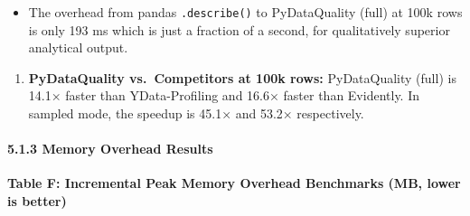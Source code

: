 \documentclass{article}
\begin{document}
\begin{itemize}
\item
  The overhead from pandas \texttt{.describe()} to PyDataQuality (full)
  at 100k rows is only 193 ms which is just a fraction of a second, for
  qualitatively superior analytical output.
\end{itemize}

\begin{enumerate}
\def\labelenumi{\arabic{enumi}.}
\setcounter{enumi}{4}
\item
  \textbf{PyDataQuality vs.~Competitors at 100k rows:} PyDataQuality
  (full) is 14.1× faster than YData-Profiling and 16.6× faster than
  Evidently. In sampled mode, the speedup is 45.1× and 53.2×
  respectively.
\end{enumerate}

\paragraph{5.1.3 Memory Overhead Results}\label{memory-overhead-results}

\textbf{Table F: Incremental Peak Memory Overhead Benchmarks (MB, lower
is better)}
\end{document}
